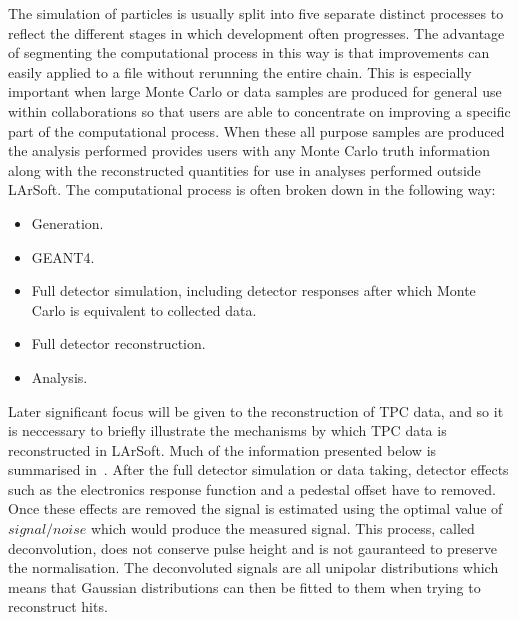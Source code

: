 The simulation of particles is usually split into five separate distinct processes to reflect the different stages in which development often progresses. The advantage of segmenting the computational process in this way is that improvements can easily applied to a file without rerunning the entire chain. This is especially important when large Monte Carlo or data samples are produced for general use within collaborations so that users are able to concentrate on improving a specific part of the computational process. When these all purpose samples are produced the analysis performed provides users with any Monte Carlo truth information along with the reconstructed quantities for use in analyses performed outside LArSoft. The computational process is often broken down in the following way:
\begin{itemize}
\item Generation.
\item GEANT4.
\item Full detector simulation, including detector responses after which Monte Carlo is equivalent to collected data.
\item Full detector reconstruction.
\item Analysis.
\end{itemize}

Later significant focus will be given to the reconstruction of TPC data, and so it is neccessary to briefly illustrate the mechanisms by which TPC data is reconstructed in LArSoft. Much of the information presented below is summarised in~\citep{LArSoftRecoNote}. After the full detector simulation or data taking, detector effects such as the electronics response function and a pedestal offset have to removed. Once these effects are removed the signal is estimated using the optimal value of $signal/noise$ which would produce the measured signal. This process, called deconvolution, does not conserve pulse height and is not gauranteed to preserve the normalisation. The deconvoluted signals are all unipolar distributions which means that Gaussian distributions can then be fitted to them when trying to reconstruct hits. \\

